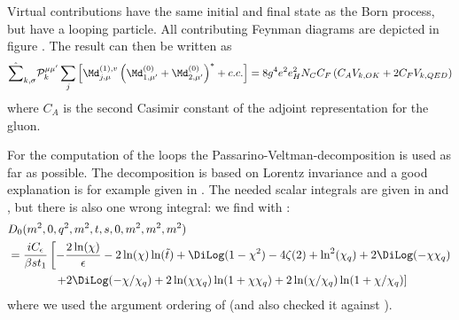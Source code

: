 Virtual contributions have the same initial and final state as the Born process, but have a looping particle. All contributing Feynman diagrams are depicted in figure .
The result can then be written as
\begin{equation}
\hat\sum_{k,\sigma}\mathcal P_{k}^{\mu\mu'}\sum_{j}\left[\Md^{(1),v}_{j,\mu}\left(\Md^{(0)}_{1,\mu'}+\Md^{(0)}_{2,\mu'}\right)^*+c.c.\right] = 8g^4e^2e_H^2 N_C C_F\left( C_A V_{k,OK} + 2C_F V_{k,QED}\right)
\end{equation}
where $C_A$ is the second Casimir constant of the adjoint representation for the gluon.

For the computation of the loops the Passarino-Veltman-decomposition\cite{Passarino:1978jh} is used as far as possible. The decomposition is based on Lorentz invariance and a good explanation is for example given in \cite{Bojak:2000eu}. The needed scalar integrals are given in \cite{PhysRevD4054} and \cite{Laenen1993162}, but there is also one wrong integral: we find with \cite[Box 16]{Ellis:2007qk}:
\begin{align}
&D_0(m^2,0,q^2,m^2,t,s,0,m^2,m^2,m^2)\nonumber\\
 &=\frac{i C_\epsilon}{\beta s t_1}\left[-\frac{2\ln(\chi)}{\epsilon} -2\ln(\chi)\ln(\tilde t)+\DiLog(1-\chi^2)-4\zeta(2)+\ln^2(\chi_q) + 2\DiLog(-\chi\chi_q)\right.\nonumber\\
 &\hspace{40pt}\left. +2\DiLog(-\chi/\chi_q)+2\ln(\chi\chi_q)\ln(1+\chi\chi_q)+2\ln(\chi/\chi_q)\ln(1+\chi/\chi_q)\right]
\end{align}
where we used the argument ordering of \LoopTools\cite{Hahn:1998yk,LoopTools212Guide} (and also checked it against \LoopTools).
